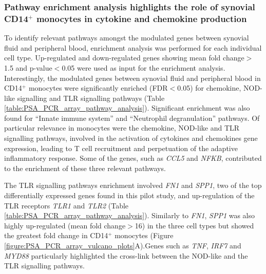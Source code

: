 \subsubsection{Pathway enrichment analysis highlights the role of synovial CD14$^+$ monocytes in cytokine and chemokine production}
To identify relevant pathways amongst the modulated genes between synovial fluid and peripheral blood, enrichment analysis was performed for each individual cell type. Up-regulated and down-regulated genes showing mean fold change$>$1.5 and p-value$<$0.05 were used as input for the enrichment analysis. Interestingly, the modulated genes between synovial fluid and peripheral blood in CD14$^+$ monocytes were significantly enriched (FDR$<$0.05) for chemokine, NOD-like signalling and TLR signalling pathways (Table \ref{table:PSA_PCR_array_pathway_analysis}). Significant enrichment was also found for ``Innate immune system'' and ``Neutrophil degranulation'' pathways. Of particular relevance in monocytes were the chemokine, NOD-like and TLR signalling pathways, involved in the activation of cytokines and chemokines gene expression, leading to T cell recruitment and perpetuation of the adaptive inflammatory response. Some of the genes, such as \textit{CCL5} and \textit{NFKB}, contributed to the enrichment of these three relevant pathways.

The TLR signalling pathways enrichment involved \textit{FN1} and \textit{SPP1}, two of the top differentially expressed genes found in this pilot study, and up-regulation of the TLR receptors \textit{TLR1} and \textit{TLR2} (Table \ref{table:PSA_PCR_array_pathway_analysis}). Similarly to \textit{FN1}, \textit{SPP1} was also highly up-regulated (mean fold change$>$16) in the three cell types but showed the greatest fold change in CD14$^+$ monocytes (Figure \ref{figure:PSA_PCR_array_vulcano_plots}A).Genes such as \textit{TNF}, \textit{IRF7} and \textit{MYD88} particularly highlighted the cross-link between the NOD-like and the TLR signalling pathways. 


